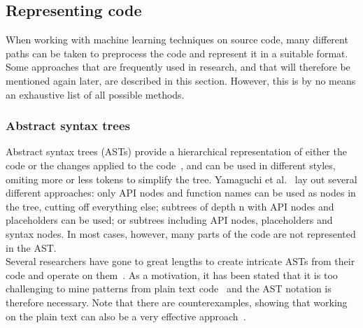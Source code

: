 \documentclass[
a4paper,
pagesize,
pdftex,
12pt,
twoside, %
BCOR=5mm, %
ngerman,
fleqn,
final,
]{scrartcl}
\begin{document}
	\subsection{Representing code}
	
	When working with machine learning techniques on source code, many different paths can be taken to preprocess the code and represent it in a suitable format. Some approaches that are frequently used in research, and that will therefore be mentioned again later, are described in this section. However, this is by no means an exhaustive list of all possible methods. 
	
	\subsubsection{Abstract syntax trees}
	Abstract syntax trees (ASTs) provide a hierarchical representation of either the code or the changes applied to the code~\cite{Liu.2018}, and can be used in different styles, omiting more or less tokens to simplify the tree. Yamaguchi et al.~\cite{Yamaguchi.2012} lay out several different approaches: only API nodes and function names can be used as nodes in the tree, cutting off everything else; subtrees of depth n with API nodes and placeholders can be used; or subtrees including API nodes, placeholders and syntax nodes. In most cases, however, many parts of the code are not represented in the AST.\\ Several researchers have gone to great lengths to create intricate ASTs from their code and operate on them~\cite{Ma.2017,Yamaguchi.2012}. As a motivation, it has been stated that it is too challenging to mine patterns from plain text code~\cite{Liu.2018} and the AST notation is therefore necessary. Note that there are counterexamples, showing that working on the plain text can also be a very effective approach~\cite{Russell.2018,Hovsepyan.2012}.\\
	
\end{document}

